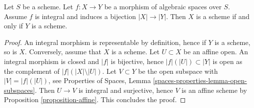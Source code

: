 \begin{lemma}
\label{lemma-integral-universally-bijective-scheme}
Let $S$ be a scheme. Let $f : X \to Y$ be a morphism of algebraic spaces
over $S$. Assume $f$ is integral and induces a bijection $|X| \to |Y|$.
Then $X$ is a scheme if and only if $Y$ is a scheme.
\end{lemma}

\begin{proof}
An integral morphism is representable by definition, hence if $Y$
is a scheme, so is $X$. Conversely, assume that $X$ is a scheme.
Let $U \subset X$ be an affine open. An integral morphism is
closed and $|f|$ is bijective, hence $|f|(|U|) \subset |Y|$
is open as the complement of $|f|(|X| \setminus |U|)$. Let
$V \subset Y$ be the open subspace with $|V| = |f|(|U|)$, see
Properties of Spaces, Lemma \ref{spaces-properties-lemma-open-subspaces}.
Then $U \to V$ is integral and surjective, hence
$V$ is an affine scheme by Proposition \ref{proposition-affine}.
This concludes the proof.
\end{proof}





























